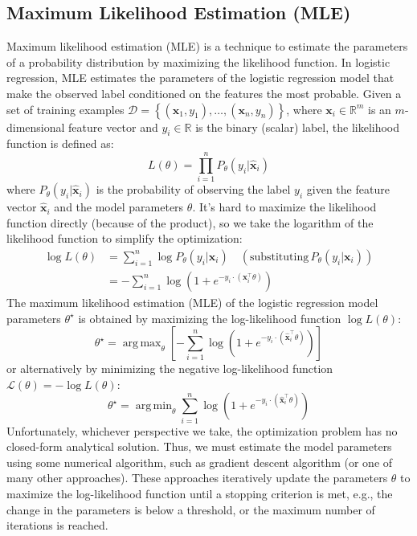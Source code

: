\documentclass{article}[11pt]
\DeclareMathOperator*{\argmin}{arg\,min}
\DeclareMathOperator*{\argmax}{arg\,max}
\begin{document}
\subsection{Maximum Likelihood Estimation (MLE)}
Maximum likelihood estimation (MLE) is a technique to estimate the parameters of a probability distribution by maximizing the likelihood function.
In logistic regression, MLE estimates the parameters of the logistic regression model that make the observed label conditioned on the features the most probable.
Given a set of training examples $\mathcal{D} = \left\{\left(\mathbf{x}_{1}, y_{1}\right),\dots,\left(\mathbf{x}_{n}, y_{n}\right)\right\}$, where $\mathbf{x}_{i}\in\mathbb{R}^{m}$ is an $m$-dimensional feature vector 
and $y_{i}\in\mathbb{R}$ is the binary (scalar) label, the likelihood function is defined as:
\begin{equation}
L(\theta) = \prod_{i=1}^{n}P_{\theta}(y_{i}|\hat{\mathbf{x}}_{i})
\end{equation}
where $P_{\theta}(y_{i}|\hat{\mathbf{x}}_{i})$ is the probability of observing the label $y_{i}$ given the feature vector $\hat{\mathbf{x}}_{i}$ and the model parameters $\theta$.
It's hard to maximize the likelihood function directly (because of the product), so we take the logarithm of the likelihood function to simplify the optimization:
\begin{align*}
\log{L}(\theta) & = \sum_{i=1}^{n}\log P_{\theta}(y_{i}|\mathbf{x}_{i})\quad(\text{substituting}\,P_{\theta}(y_{i}|\mathbf{x}_{i}))\\
    & = -\sum_{i=1}^{n}\log\left(1 + e^{-y_{i}\cdot\left(\mathbf{x}_{i}^{\top}\theta\right)}\right)
\end{align*}
The maximum likelihood estimation (MLE) of the logistic regression model parameters $\theta^{\star}$ is obtained by maximizing the log-likelihood function
$\log{L}(\theta)$:
\begin{equation}
\theta^{\star} = \argmax_{\theta}\left[-\sum_{i=1}^{n}\log\left(1 + e^{-y_{i}\cdot\left(\hat{\mathbf{x}}^{\top}_{i}\theta\right)}\right)\right]
\end{equation}
or alternatively by minimizing the negative log-likelihood function $\mathcal{L}(\theta) = -\log{L}(\theta)$:
\begin{equation}
    \theta^{\star}  = \argmin_{\theta} \sum_{i=1}^{n}\log\left(1 + e^{-y_{i}\cdot\left(\hat{\mathbf{x}}^{\top}_{i}\theta\right)}\right)
\end{equation}
Unfortunately, whichever perspective we take, the optimization problem has no closed-form analytical solution.
Thus, we must estimate the model parameters using some numerical algorithm, such as gradient descent algorithm (or one of many other approaches).
These approaches iteratively update the parameters $\theta$ to maximize the log-likelihood function
until a stopping criterion is met, e.g., the change in the parameters is below a threshold, or the maximum number of iterations is reached.
\end{document}
